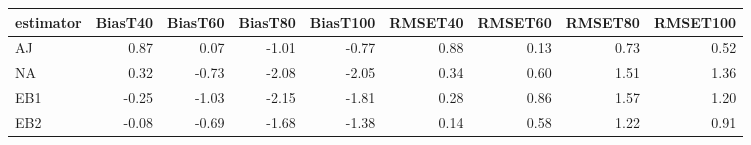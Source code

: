 \begin{table}[ht]
\centering
\begin{tabular}{lrrrrrrrr}
  \toprule
estimator & BiasT40 & BiasT60 & BiasT80 & BiasT100 & RMSET40 & RMSET60 & RMSET80 & RMSET100 \\ 
  \midrule
AJ & 0.87 & 0.07 & -1.01 & -0.77 & 0.88 & 0.13 & 0.73 & 0.52 \\ 
  NA & 0.32 & -0.73 & -2.08 & -2.05 & 0.34 & 0.60 & 1.51 & 1.36 \\ 
  EB1 & -0.25 & -1.03 & -2.15 & -1.81 & 0.28 & 0.86 & 1.57 & 1.20 \\ 
  EB2 & -0.08 & -0.69 & -1.68 & -1.38 & 0.14 & 0.58 & 1.22 & 0.91 \\ 
   \bottomrule
\end{tabular}
\end{table}
